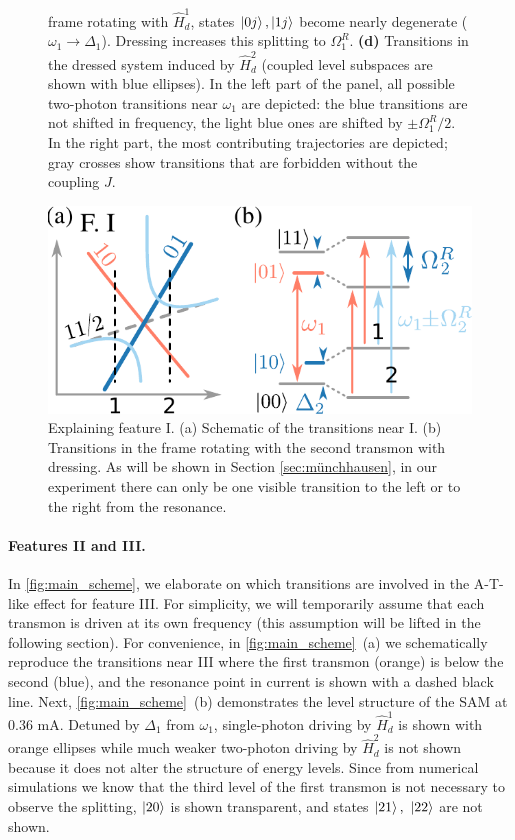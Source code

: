 \documentclass[%
 aps, prx,
 amsmath,amssymb,
 reprint,%
superscriptaddress
]{revtex4-2}
\begin{document}
\begin{figure}
{	frame rotating with $\hat 
	H_{d}^1$, states $\ket{0j},\ket{1j}$ 
	become nearly degenerate ($\omega_1 
	\rightarrow \Delta_1$). Dressing increases this splitting to 
	$\Omega_1^R$. \textbf{(d)} Transitions in the 
	dressed system induced by $\hat 
	H_{d}^2$ (coupled level subspaces are shown with blue ellipses). In 
	the left part of the panel, all possible 
	two-photon transitions near $\omega_1$ are 
	depicted: the blue transitions are not 
	shifted in frequency, the light blue ones are shifted 
	by $\pm\Omega^R_1/2$. In the right 
	part, the most contributing trajectories are 
	depicted; gray crosses show transitions that 
	are forbidden without the coupling $J$.}
	\label{fig:main_scheme}
\end{figure}

\begin{figure}
	\includegraphics[width=.9\linewidth]{topo_scheme}
	\caption{Explaining feature I. (a) Schematic of the transitions near I. (b) Transitions in the frame rotating with the second transmon with dressing. As will be shown in Section \ref{sec:münchhausen}, in our experiment there can only be one visible transition to the left or to the right from the resonance.}
	\label{fig:featureI}
\end{figure} 

\paragraph{Features II and III.}  

In \autoref{fig:main_scheme}, we elaborate on which transitions
are involved in the A-T-like effect for feature III. 
For simplicity, we will temporarily assume that 
each transmon is driven at its own frequency 
(this assumption will be lifted in the following 
section). For convenience, in 
\autoref{fig:main_scheme}~(a) we schematically 
reproduce the transitions near III where the 
first transmon (orange) is below the second 
(blue), and the resonance point in current is 
shown with a dashed black line. Next, 
\autoref{fig:main_scheme}~(b) demonstrates the 
level structure of the SAM at 0.36 mA. Detuned by 
$\Delta_1$ from $\omega_1$, single-photon driving by 
$\hat H_d^1$ is shown with orange ellipses while 
much weaker two-photon driving by $\hat H_d^2$ is not shown because it does not alter the structure of energy levels. Since from numerical simulations we know 
that the third level of the first transmon is not 
necessary to observe the splitting, $\ket{20}$ is 
shown transparent, and states $\ket{21},\ 
\ket{22}$ are not shown.
\end{document}
